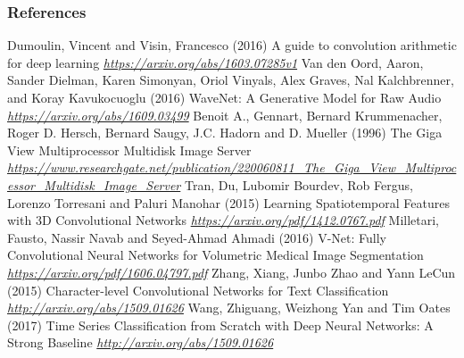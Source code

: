 \begin{vbframe}
\frametitle{References}
\footnotesize{
\begin{thebibliography}{99}

 Dumoulin, Vincent and Visin, Francesco (2016)
\newblock A guide to convolution arithmetic for deep learning
\newblock \emph{\url{https://arxiv.org/abs/1603.07285v1}}
 Van den Oord, Aaron, Sander Dielman, Karen Simonyan, Oriol Vinyals, Alex Graves, Nal Kalchbrenner, and Koray Kavukocuoglu (2016)
\newblock WaveNet: A Generative Model for Raw Audio
\newblock \emph{\url{https://arxiv.org/abs/1609.03499}}
 Benoit A., Gennart, Bernard Krummenacher, Roger D. Hersch, Bernard Saugy, J.C. Hadorn and D. Mueller (1996)
\newblock The Giga View Multiprocessor Multidisk Image Server
\newblock \emph{\url{https://www.researchgate.net/publication/220060811_The_Giga_View_Multiprocessor_Multidisk_Image_Server}}
 Tran, Du, Lubomir Bourdev, Rob Fergus,  Lorenzo Torresani and Paluri Manohar (2015)
\newblock Learning Spatiotemporal Features with 3D Convolutional Networks
\newblock \emph{\url{https://arxiv.org/pdf/1412.0767.pdf}}
 Milletari, Fausto, Nassir Navab and  Seyed-Ahmad Ahmadi (2016)
\newblock V-Net: Fully Convolutional Neural Networks for
Volumetric Medical Image Segmentation
\newblock \emph{\url{https://arxiv.org/pdf/1606.04797.pdf}}
 Zhang, Xiang, Junbo Zhao and Yann LeCun (2015)
\newblock Character-level Convolutional Networks for Text Classification
\newblock \emph{\url{http://arxiv.org/abs/1509.01626}}
 Wang, Zhiguang, Weizhong Yan and Tim Oates (2017)
\newblock Time Series Classification from Scratch with Deep Neural Networks: A Strong Baseline
\newblock \emph{\url{http://arxiv.org/abs/1509.01626}}

\end{thebibliography}}
\end{vbframe}
